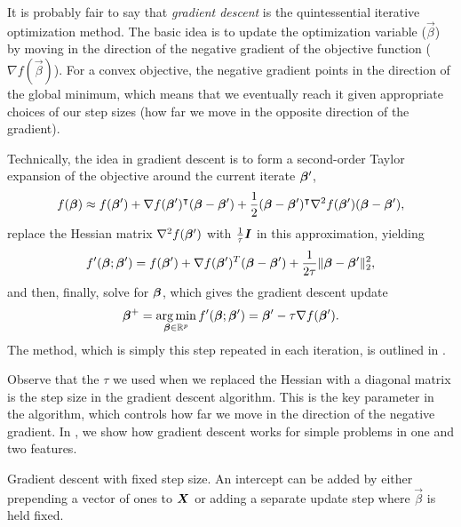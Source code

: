 It is probably fair to say that \emph{gradient descent} is the quintessential iterative optimization method. The basic idea is to update the optimization variable (\(\vec{\beta}\)) by moving in the direction of the negative gradient of the objective function (\(\nabla f (\vec{\beta})\)). For a convex objective, the negative gradient points in the direction of the global minimum, which means that we eventually reach it given appropriate choices of our step sizes (how far we move in the opposite direction of the gradient).

Technically, the idea in gradient descent is to form a second-order Taylor expansion of the objective around the current iterate \(\boldsymbol{\beta}'\),
\begin{equation*}
  f(\boldsymbol{\beta}) \approx f(\boldsymbol{\beta}') + \nabla f(\boldsymbol{\beta}')^\intercal (\boldsymbol{\beta} - \boldsymbol{\beta}') + \frac{1}{2}(\boldsymbol{\beta} - \boldsymbol{\beta}')^\intercal \nabla^2 f(\boldsymbol{\beta}')(\boldsymbol{\beta} - \boldsymbol{\beta}'),
\end{equation*}
replace the Hessian matrix \(\nabla^2 f(\boldsymbol{\beta}')\) with \(\frac {1}{\tau} \boldsymbol{I}\) in this approximation, yielding
\begin{equation*}
  f'(\boldsymbol{\beta}; \boldsymbol{\beta}') = f(\boldsymbol{\beta}') + \nabla f(\boldsymbol{\beta}')^T(\boldsymbol{\beta} - \boldsymbol{\beta}') + \frac{1}{2\tau}\lVert \boldsymbol{\beta} - \boldsymbol{\beta}'\rVert_2^2,
\end{equation*}
and then, finally, solve for \(\boldsymbol{\beta}\), which gives the gradient descent update
\[
  \boldsymbol{\beta}^+ =\operatorname*{arg\,min}_{\boldsymbol{\beta} \in \mathbb{R}^p} f'(\boldsymbol{\beta}; \boldsymbol{\beta}') = \boldsymbol{\beta}' - \tau \nabla f(\boldsymbol{\beta}').
\]
The method, which is simply this step repeated in each iteration, is outlined in .

Observe that the \(\tau\) we used when we replaced the Hessian with a diagonal matrix is the step size in the gradient descent algorithm. This is the key parameter in the algorithm, which controls how far we move in the direction of the negative gradient.
In , we show how gradient descent works for simple problems in one and two features.

\begin{algorithm}
  \caption{Gradient descent with fixed step size. An intercept can be added by either prepending a vector of ones to \(\boldsymbol{X}\) or adding a separate update step where \(\vec{\beta}\) is held fixed.}
  \label{alg:gradient-descent}

\end{algorithm}

